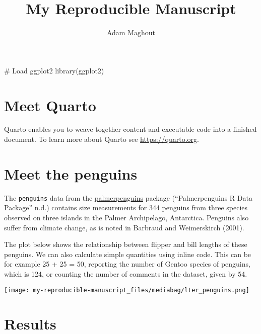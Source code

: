 \documentclass[
  letterpaper,
  DIV=11,
  numbers=noendperiod]{scrartcl}
\title{My Reproducible Manuscript}
\author{Adam Maghout}
\date{}
\newenvironment{Shaded}{\begin{snugshade}}{\end{snugshade}}
\newcommand{\CommentTok}[1]{\textcolor[rgb]{0.37,0.37,0.37}{#1}}
\newcommand{\FunctionTok}[1]{\textcolor[rgb]{0.28,0.35,0.67}{#1}}
\newcommand{\NormalTok}[1]{\textcolor[rgb]{0.00,0.23,0.31}{#1}}
\begin{document}
\maketitle


\begin{Shaded}
\begin{Highlighting}[]
\CommentTok{\# Load ggplot2}
\FunctionTok{library}\NormalTok{(ggplot2)}
\end{Highlighting}
\end{Shaded}

\section{Meet Quarto}\label{meet-quarto}

Quarto enables you to weave together content and executable code into a
finished document. To learn more about Quarto see
\url{https://quarto.org}.

\section{Meet the penguins}\label{meet-the-penguins}

The \texttt{penguins} data from the
\href{https://allisonhorst.github.io/palmerpenguins/}{palmerpenguins}
package ({``Palmerpenguins {R} Data Package''} n.d.) contains size
measurements for 344 penguins from three species observed on three
islands in the Palmer Archipelago, Antarctica. Penguins also suffer from
climate change, as is noted in Barbraud and Weimerskirch (2001).

The plot below shows the relationship between flipper and bill lengths
of these penguins. We can also calculate simple quantities using inline
code. This can be for example 25 + 25 = 50, reporting the number of
Gentoo species of penguins, which is 124, or counting the number of
comments in the dataset, given by 54.

\texttt{[image: my-reproducible-manuscript\_files/mediabag/lter\_penguins.png]}

\section{Results}\label{results}
\end{document}
